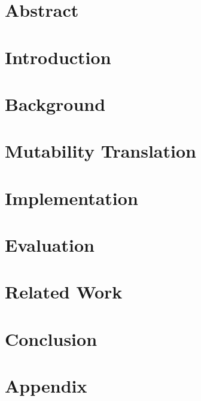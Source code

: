 \frontmatter
\chapter*{Abstract}



\tableofcontents

\mainmatter

\chapter{Introduction}


\chapter{Background}
\label{background}


\chapter{Mutability Translation}
\label{translation}


\chapter{Implementation}
\label{implementation}


\chapter{Evaluation}
\label{evaluation}


\chapter{Related Work}
\label{related-work}


\chapter{Conclusion}
\label{conclusion}



\appendix




\chapter{Appendix}


